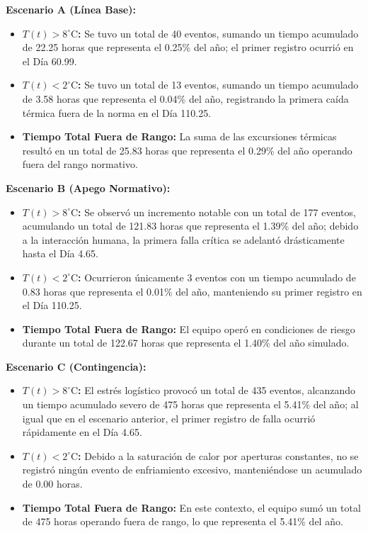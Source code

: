 \documentclass[
  spanish,
  us-letterpaper,
]{scrreprt}
\providecommand{\tightlist}{%
  \setlength{\itemsep}{0pt}\setlength{\parskip}{0pt}}
\numberwithin{equation}{section}
\theoremstyle{plain}
\theoremstyle{plain}
\theoremstyle{definition}
\theoremstyle{plain}
\theoremstyle{remark}
\begin{document}
\textbf{Escenario A (Línea Base):}

\begin{itemize}
\tightlist
\item
  \textbf{\(T(t)>8^\circ\text{C}\):} Se tuvo un total de 40 eventos,
  sumando un tiempo acumulado de 22.25 horas que representa el 0.25\%
  del año; el primer registro ocurrió en el Día 60.99.
\item
  \textbf{\(T(t)<2^\circ\text{C}\):} Se tuvo un total de 13 eventos,
  sumando un tiempo acumulado de 3.58 horas que representa el 0.04\% del
  año, registrando la primera caída térmica fuera de la norma en el Día
  110.25.
\item
  \textbf{Tiempo Total Fuera de Rango:} La suma de las excursiones
  térmicas resultó en un total de 25.83 horas que representa el 0.29\%
  del año operando fuera del rango normativo.
\end{itemize}

\textbf{Escenario B (Apego Normativo):}

\begin{itemize}
\tightlist
\item
  \textbf{\(T(t)>8^\circ\text{C}\):} Se observó un incremento notable
  con un total de 177 eventos, acumulando un total de 121.83 horas que
  representa el 1.39\% del año; debido a la interacción humana, la
  primera falla crítica se adelantó drásticamente hasta el Día 4.65.
\item
  \textbf{\(T(t)<2^\circ\text{C}\):} Ocurrieron únicamente 3 eventos con
  un tiempo acumulado de 0.83 horas que representa el 0.01\% del año,
  manteniendo su primer registro en el Día 110.25.
\item
  \textbf{Tiempo Total Fuera de Rango:} El equipo operó en condiciones
  de riesgo durante un total de 122.67 horas que representa el 1.40\%
  del año simulado.
\end{itemize}

\textbf{Escenario C (Contingencia):}

\begin{itemize}
\tightlist
\item
  \textbf{\(T(t)>8^\circ\text{C}\):} El estrés logístico provocó un
  total de 435 eventos, alcanzando un tiempo acumulado severo de 475
  horas que representa el 5.41\% del año; al igual que en el escenario
  anterior, el primer registro de falla ocurrió rápidamente en el Día
  4.65.
\item
  \textbf{\(T(t)<2^\circ\text{C}\):} Debido a la saturación de calor por
  aperturas constantes, no se registró ningún evento de enfriamiento
  excesivo, manteniéndose un acumulado de 0.00 horas.
\item
  \textbf{Tiempo Total Fuera de Rango:} En este contexto, el equipo sumó
  un total de 475 horas operando fuera de rango, lo que representa el
  5.41\% del año.
\end{itemize}
\end{document}
